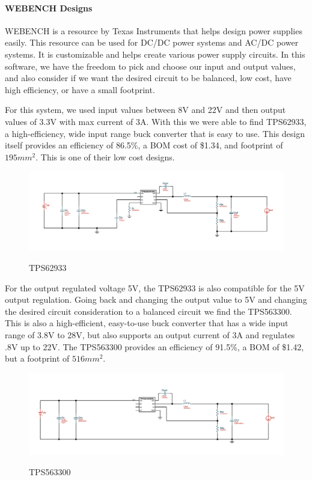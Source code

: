  \paragraph{WEBENCH Designs}
 WEBENCH is a resource by Texas Instruments that helps design power supplies easily. This resource can be used for DC/DC power systems and AC/DC power systems. It is customizable and helps create various power supply circuits. In this software, we have the freedom to pick and choose our input and output values, and also consider if we want the desired circuit to be balanced, low cost, have high efficiency, or have a small footprint. \par
 For this system, we used input values between 8V and 22V and then output values of 3.3V with max current of 3A. With this we were able to find TPS62933, a high-efficiency, wide input range buck converter that is easy to use. This design itself provides an efficiency of 86.5\%, a BOM cost of \$1.34, and footprint of $195mm^2$. This is one of their low cost designs.\par
 \begin{figure}[H]
    \centering
    \caption{TPS62933}
    \includegraphics[width=\textwidth]{images/TPS62933.png}
    \label{fig:WEBENCH Design TPS62933}
\end{figure}
For the output regulated voltage 5V, the TPS62933 is also compatible for the 5V output regulation. Going back and changing the output value to 5V and changing the desired circuit consideration to a balanced circuit we find the TPS563300. This is also a high-efficient, easy-to-use buck converter that has a wide input range of 3.8V to 28V, but also supports an output current of 3A and regulates .8V up to 22V. The TPS563300 provides an efficiency of 91.5\%, a BOM of \$1.42, but a footprint of $516mm^2$. \par
\begin{figure}[H]
    \centering
    \caption{TPS563300}
    \includegraphics[width=\textwidth]{images/TPS563300.png}
    \label{fig:WEBENCH Design TPS563300}
\end{figure}
